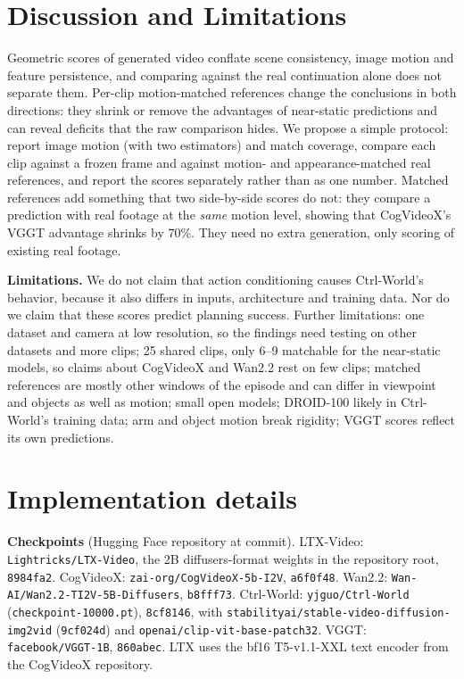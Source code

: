 \documentclass{article}
\begin{document}
\section{Discussion and Limitations}
Geometric scores of generated video conflate scene consistency, image motion and feature
persistence, and comparing against the real continuation alone does not separate them. Per-clip motion-matched references change the conclusions in both directions: they
shrink or remove the advantages of near-static predictions and can reveal deficits that the raw
comparison hides. We propose a simple protocol: report image
motion (with two estimators) and match coverage, compare each clip against a frozen frame and
against motion- and appearance-matched real references, and report the scores separately rather than
as one number. Matched references add something that two side-by-side scores do not: they compare a
prediction with real footage at the \emph{same} motion level, showing that CogVideoX's VGGT
advantage shrinks by 70\%. They need no extra generation, only scoring of existing real footage.

\textbf{Limitations.} We do not claim that action conditioning causes Ctrl-World's behavior, because it also
differs in inputs, architecture and training data. Nor do we claim that these scores predict
planning success. Further limitations: one dataset and camera at low resolution, so the findings need testing on
other datasets and more clips; 25 shared clips, only 6--9 matchable for the near-static models, so
claims about CogVideoX and Wan2.2 rest on few clips; matched references are mostly other windows of
the episode and can differ in viewpoint and objects as well as motion; small open models; DROID-100 likely in Ctrl-World's training
data; arm and object motion break rigidity; VGGT scores reflect its own predictions.



\clearpage
\appendix
\section{Implementation details}
\label{app:details}
\textbf{Checkpoints} (Hugging Face repository at commit). LTX-Video: \texttt{Lightricks/LTX-Video}, the
2B diffusers-format weights in the repository root, \texttt{8984fa2}. CogVideoX:
\texttt{zai-org/CogVideoX-5b-I2V}, \texttt{a6f0f48}. Wan2.2: \texttt{Wan-AI/Wan2.2-TI2V-5B-Diffusers},
\texttt{b8fff73}. Ctrl-World: \texttt{yjguo/Ctrl-World} (\texttt{checkpoint-10000.pt}), \texttt{8cf8146},
with \texttt{stabilityai/stable-video-diffusion-img2vid} (\texttt{9cf024d}) and
\texttt{openai/clip-vit-base-patch32}. VGGT: \texttt{facebook/VGGT-1B}, \texttt{860abec}. LTX uses the
bf16 T5-v1.1-XXL text encoder from the CogVideoX repository.
\end{document}
